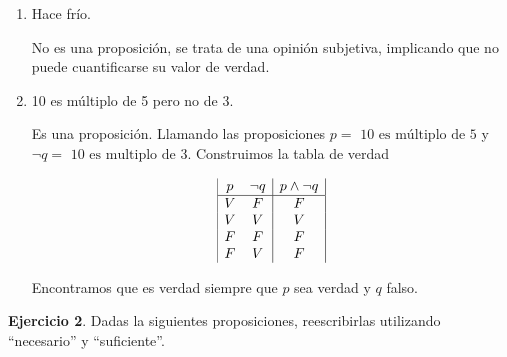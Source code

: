 \begin{enumerate}
	Para la misma se utilizo la definici\'on de tabla de verdad del \textbf{condicional} $\rightarrow$ que tiene la forma:

	\begin{displaymath}
		\begin{array}{|c c|c|}
			p & q & p \rightarrow q\\
			\hline 
			V & V & V\\
			V & F & F\\
			F & V & V\\
			F & F & V\\
		\end{array}
	\end{displaymath}

	Y por lo tanto, concluimos que la proposici\'on ser\'a siempre verdadera cuando $q$ sea falsa.
	
	\item Hace frío.
	
	No es una proposici\'on, se trata de una opini\'on subjetiva, implicando que no puede cuantificarse su valor de verdad.
	
	\item 10 es múltiplo de 5 pero no de 3. 
	
	Es una proposici\'on. Llamando las proposiciones $p = \text{ 10 es m\'ultiplo de 5}$ y $\neg q = \text{ 10 es multiplo de 3}$. Construimos la tabla de verdad
	
	\begin{displaymath}
		\begin{array}{|c c|c|}
			p & \neg q & p \wedge \neg q\\
			\hline 
			V & F & F\\
			V & V & V\\
			F & F & F\\
			F & V & F\\
		\end{array}
	\end{displaymath}

	Encontramos que es verdad siempre que $p$ sea verdad y $q$ falso.
\end{enumerate}

\textbf{Ejercicio 2}. Dadas la siguientes proposiciones, reescribirlas utilizando “necesario” y “suficiente”.

